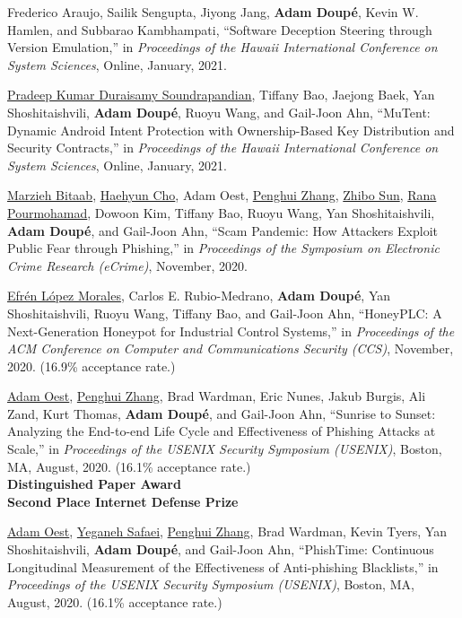 \documentclass[11pt,letterpaper,sans]{moderncv}
\begin{document}
\begin{etaremune}
\item Frederico Araujo, Sailik Sengupta, Jiyong Jang, \textbf{Adam Doup\'e}, Kevin W. Hamlen, and Subbarao Kambhampati, ``Software Deception Steering through Version Emulation,'' in \emph{Proceedings of the Hawaii International Conference on System Sciences}, Online, January, 2021.

\item \underline{Pradeep Kumar Duraisamy Soundrapandian}, Tiffany Bao, Jaejong Baek, Yan Shoshitaishvili, \textbf{Adam Doup\'e}, Ruoyu Wang, and Gail-Joon Ahn, ``MuTent: Dynamic Android Intent Protection with Ownership-Based Key Distribution and Security Contracts,'' in \emph{Proceedings of the Hawaii International Conference on System Sciences}, Online, January, 2021.

\item \underline{Marzieh Bitaab}, \underline{Haehyun Cho}, Adam Oest, \underline{Penghui Zhang}, \underline{Zhibo Sun}, \underline{Rana Pourmohamad}, Dowoon Kim, Tiffany Bao, Ruoyu Wang, Yan Shoshitaishvili, \textbf{Adam Doup\'e}, and Gail-Joon Ahn, ``Scam Pandemic: How Attackers Exploit Public Fear through Phishing,'' in \emph{Proceedings of the Symposium on Electronic Crime Research (eCrime)}, November, 2020.

\item \underline{Efr\'en L\'opez Morales}, Carlos E. Rubio-Medrano, \textbf{Adam Doup\'e}, Yan Shoshitaishvili, Ruoyu Wang, Tiffany Bao, and Gail-Joon Ahn, ``HoneyPLC: A Next-Generation Honeypot for Industrial Control Systems,'' in \emph{Proceedings of the ACM Conference on Computer and Communications Security (CCS)}, November, 2020. (16.9\% acceptance rate.)

\item \underline{Adam Oest}, \underline{Penghui Zhang}, Brad Wardman, Eric Nunes, Jakub Burgis, Ali Zand, Kurt Thomas, \textbf{Adam Doup\'e}, and Gail-Joon Ahn, ``Sunrise to Sunset: Analyzing the End-to-end Life Cycle and Effectiveness of Phishing Attacks at Scale,'' in \emph{Proceedings of the USENIX Security Symposium (USENIX)}, Boston, MA, August, 2020. (16.1\% acceptance rate.) \\
  \textbf{Distinguished Paper Award} \\
  \textbf{Second Place Internet Defense Prize}

\item \underline{Adam Oest}, \underline{Yeganeh Safaei}, \underline{Penghui Zhang}, Brad Wardman, Kevin Tyers, Yan Shoshitaishvili, \textbf{Adam Doup\'e}, and Gail-Joon Ahn, ``PhishTime: Continuous Longitudinal Measurement of the Effectiveness of Anti-phishing Blacklists,'' in \emph{Proceedings of the USENIX Security Symposium (USENIX)}, Boston, MA, August, 2020. (16.1\% acceptance rate.)


\end{etaremune}
\end{document}
